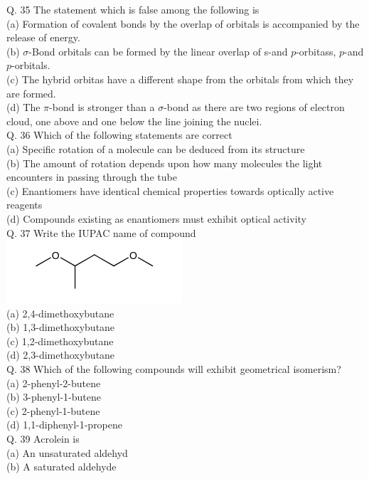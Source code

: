 \documentclass[10pt]{article}
\begin{document}
Q. 35 The statement which is false among the following is\\
(a) Formation of covalent bonds by the overlap of orbitals is accompanied by the release of energy.\\
(b) $\sigma$-Bond orbitals can be formed by the linear overlap of s-and $p$-orbitass, $p$-and $p$-orbitals.\\
(c) The hybrid orbitas have a different shape from the orbitals from which they are formed.\\
(d) The $\pi$-bond is stronger than a $\sigma$-bond as there are two regions of electron cloud, one above and one below the line joining the nuclei.\\
Q. 36 Which of the following statements are correct\\
(a) Specific rotation of a molecule can be deduced from its structure\\
(b) The amount of rotation depends upon how many molecules the light encounters in passing through the tube\\
(c) Enantiomers have identical chemical properties towards optically active reagents\\
(d) Compounds existing as enantiomers must exhibit optical activity\\
Q. 37 Write the IUPAC name of compound\\
\includegraphics{smile-98e00dec9c1876713cb44f4e25acf12a2ebf7c48}\\
(a) 2,4-dimethoxybutane\\
(b) 1,3-dimethoxybutane\\
(c) 1,2-dimethoxybutane\\
(d) 2,3-dimethoxybutane\\
Q. 38 Which of the following compounds will exhibit geometrical isomerism?\\
(a) 2-phenyl-2-butene\\
(b) 3-phenyl-1-butene\\
(c) 2-phenyl-1-butene\\
(d) 1,1-diphenyl-1-propene\\
Q. 39 Acrolein is\\
(a) An unsaturated aldehyd\\
(b) A saturated aldehyde\\
\end{document}
